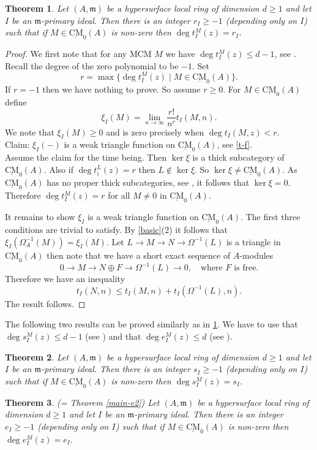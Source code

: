 \documentclass{amsart}
\newcommand{\m}{\mathfrak{m} }
\newcommand{\rt}{\rightarrow}
\newcommand{\Om}{\Omega}
\newcommand{\CMS}{\operatorname{\underline{CM}}}
\theoremstyle{plain}
\newtheorem{theorem}{Theorem}[section]
\theoremstyle{definition}
\theoremstyle{remark}
\begin{document}
\begin{theorem}\label{main-0}
Let $(A,\m)$ be a hypersurface local ring of dimension $d \geq 1$ and let $I$ be an $\m$-primary ideal. Then there is an integer $r_I \geq -1$ (depending only on $I$) such that if $M \in \CMS_0(A)$ is non-zero then $\deg t_I^M(z) = r_I$.
\end{theorem}
\begin{proof}
We first note that for any MCM $M$ we have $\deg t_I^M(z) \leq d - 1$, see \cite[Corollary 4]{Theo}. Recall the degree of the zero polynomial to be $-1$.
Set
$$ r = \max \{ \deg t_I^M(z) \mid  M \in \CMS_0(A) \}. $$
If $r = -1$ then we have nothing to prove. So assume $r \geq 0$. For $M \in \CMS_0(A)$ define
\[
\xi_I(M)  = \lim_{n \rt \infty}\frac{r!}{n^r} t_I(M,n).
\]
We note that $\xi_I(M) \geq 0$ and is zero precisely when $\deg t_I(M, z) < r$. \\
Claim:  $\xi_I(-)$ is a weak triangle function on $\CMS_0(A)$, see \ref{t-f}.\\
Assume the claim for the time being. Then $\ker \xi$ is a thick subcategory of $\CMS_0(A)$.
Also if $\deg t_i^L(z) = r$ then $L \notin \ker \xi$. So $\ker \xi \neq \CMS_0(A)$. As $\CMS_0(A)$ has no proper thick subcategories, see \cite[6.6]{T}, it follows that $\ker \xi = 0$.
Therefore $\deg t_I^M(z) = r$ for all $M \neq 0$ in $\CMS_0(A)$.

It remains to show $\xi_I $ is a weak triangle function on $\CMS_0(A)$. The first three conditions are trivial to satisfy.
By \ref{basic}(2) it follows that $\xi_I(\Om^{-1}_A(M)) = \xi_I(M)$.
Let $ L \rt M \rt N \rt \Om^{-1}(L)$ is a triangle in $\CMS_0(A)$ then note that we have a short exact sequence of $A$-modules
$$ 0 \rt M \rt N \oplus F \rt \Om^{-1}(L) \rt 0, \quad \text{where $F$ is free.}$$
Therefore we have an inequality
$$ t_I(N,n) \leq t_I(M, n) + t_I( \Om^{-1}(L), n).$$
The result follows.
\end{proof}
The following two results can be proved similarly as in \ref{main-0}. We have to use that $\deg s_I^M(z) \leq d -1$ (see \cite[Corollary 4]{Theo}) and that $\deg e_I^M(z) \leq d$ (see \cite[Corollary 7]{Theo}).
\begin{theorem}\label{main-e1-0}
Let $(A,\m)$ be a hypersurface local ring of dimension $d \geq 1$ and let $I$ be an $\m$-primary ideal. Then there is an integer $s_I \geq -1$ (depending only on $I$) such that if $M \in \CMS_0(A)$ is non-zero then $\deg s_I^M(z) = s_I$.
\end{theorem}

\begin{theorem}\label{main-e2-0} (= Theorem \ref{main-e2})
Let $(A,\m)$ be a hypersurface local ring of dimension $d \geq 1$ and let $I$ be an $\m$-primary ideal. Then there is an  integer $e_I \geq -1$ (depending only on $I$) such that if $M \in \CMS_0(A)$ is non-zero then $\deg e_I^M(z) = e_I$.
\end{theorem}
\end{document}
